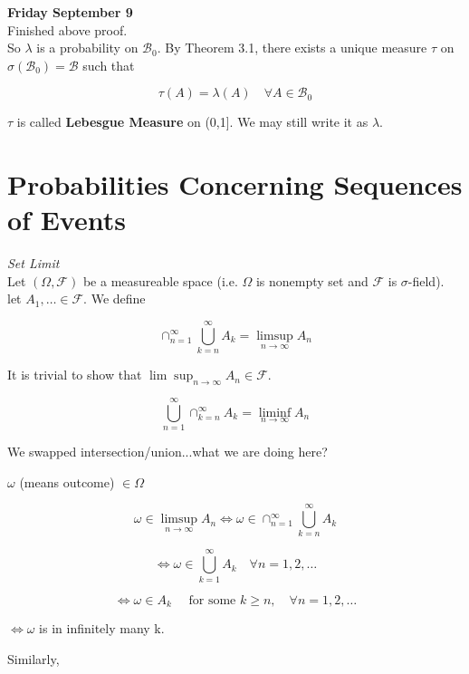 \documentclass[11pt,fleqn]{book} %
\begin{document}
\textbf{Friday September 9}\\

Finished above proof. \\

So $\lambda$ is a probability on $\mathcal{B}_0$. By Theorem 3.1, there exists a unique measure $\tau$ on $\sigma(\mathcal{B}_0) = \mathcal{B}$ such that 

		$$\tau(A) = \lambda(A) \quad \forall A \in \mathcal{B}_0 $$

$\tau$ is called \textbf{Lebesgue Measure} on (0,1]. We may still write it as $\lambda$.






\section{Probabilities Concerning Sequences of Events}

\textit{Set Limit}\\

Let $(\Omega, \mathcal{F})$ be a measureable space (i.e. $\Omega$ is nonempty set and $\mathcal{F}$ is $\sigma$-field). \\

let $A_1, \dots \in \mathcal{F}$. We define 

$$\cap^\infty_{n=1} \bigcup^\infty_{k=n} A_k = \limsup_{n\rightarrow \infty} A_n $$

It is trivial to show that $\lim\sup_{n\rightarrow \infty} A_n \in \mathcal{F}$. 


$$ \bigcup^\infty_{n=1} \cap^\infty_{k=n} A_k = \liminf_{n\rightarrow \infty} A_n $$

We swapped intersection/union...what we are doing here?

$\omega$ (means outcome) $\in \Omega$

$$\omega \in \limsup_{n \rightarrow \infty} A_n \Leftrightarrow \omega \in \cap^\infty_{n=1} \bigcup^\infty_{k=n} A_k$$

$$\Leftrightarrow \omega \in \bigcup^\infty_{k=1} A_k \quad \forall n=1, 2, \dots $$

$$\Leftrightarrow \omega \in A_k \quad \text{ for some }k\geq n, \quad \forall n = 1, 2, \dots $$

$\Leftrightarrow \omega$ is in infinitely many k. 

Similarly, 
\end{document}
